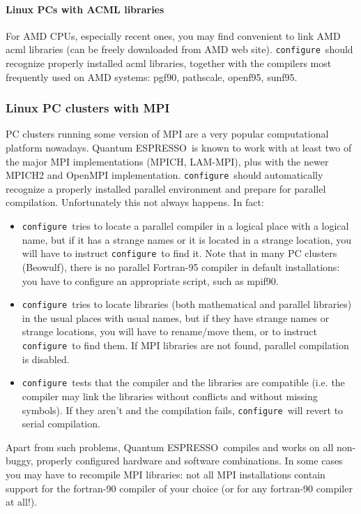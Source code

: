 \documentclass[12pt,a4paper]{article}
\def\qe{{\sc Quantum ESPRESSO}}
\def\configure{\texttt{configure}}
\begin{document}
\paragraph{Linux PCs with ACML libraries}
For AMD CPUs, especially recent ones, you may find convenient to 
link AMD acml libraries (can be freely downloaded from AMD web site). 
\configure\ should recognize properly installed acml libraries,
together with the compilers most frequently used on AMD systems:
pgf90, pathscale, openf95, sunf95.

\subsubsection{Linux PC clusters with MPI}
\label{SubSec:LinuxPCMPI}
PC clusters running some version of MPI are a very popular
computational platform nowadays. \qe\ is known to work
with at least two of the major MPI implementations (MPICH, LAM-MPI),
plus with the newer MPICH2 and OpenMPI implementation. 
\configure\ should automatically recognize a properly installed
parallel environment and prepare for parallel compilation. 
Unfortunately this not always happens. In fact:
\begin{itemize}
\item \configure\ tries to locate a parallel compiler in a logical
  place with a logical name,  but if it has a strange names or it is
  located  in a strange location, you will have to instruct \configure\ 
  to find it. Note that in many PC clusters (Beowulf), there is no
  parallel Fortran-95 compiler in default installations:  you have to
  configure an appropriate script, such as mpif90. 
\item \configure\ tries to locate libraries (both mathematical and
  parallel libraries) in the usual places with usual names, but if
  they have strange names or strange locations, you will have to
  rename/move them, or to instruct \configure\ to find them. If MPI
  libraries are not found,
  parallel compilation is disabled. 
\item \configure\ tests that the compiler and the libraries are
  compatible (i.e. the compiler may link the libraries without
  conflicts and without missing symbols). If they aren't and the
  compilation fails, \configure\ will revert to serial compilation. 
\end{itemize}

Apart from such problems, \qe\ compiles and works on all non-buggy, properly
configured hardware and software combinations. In some cases you may have to
recompile MPI libraries: not all MPI installations contain support for
the fortran-90 compiler of your choice (or for any fortran-90 compiler
at all!). 
\end{document}
